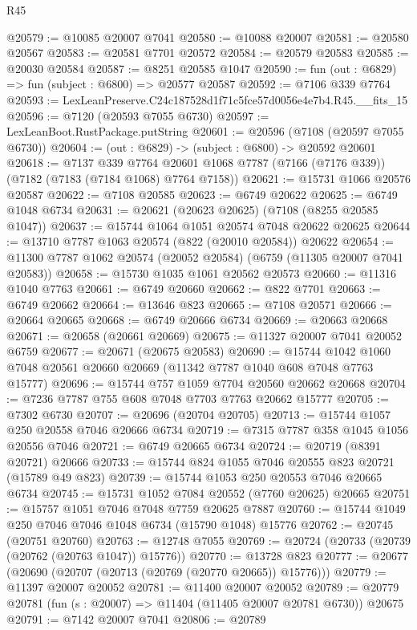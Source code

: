 \begin{lexlean}{R45}
\begin{coremodule}
{@20579 := @10085 @20007 @7041
@20580 := @10088 @20007
@20581 := @20580 @20567
@20583 := @20581 @7701 @20572
@20584 := @20579 @20583
@20585 := @20030 @20584
@20587 := @8251 @20585 @1047
@20590 := fun (out : @6829) => fun (subject : @6800) => @20577 @20587
@20592 := @7106 @339 @7764
@20593 := LexLeanPreserve.C24c187528d1f71c5fce57d0056e4e7b4.R45.__fits_15
@20596 := @7120 (@20593 @7055 @6730)
@20597 := LexLeanBoot.RustPackage.putString
@20601 := @20596 (@7108 (@20597 @7055 @6730))
@20604 := (out : @6829) -> (subject : @6800) -> @20592 @20601
@20618 := @7137
    @339
    @7764
    @20601
    @1068
    @7787
    (@7166 (@7176 @339))
    (@7182 (@7183 (@7184 @1068) @7764 @7158))
@20621 := @15731 @1066 @20576 @20587
@20622 := @7108 @20585
@20623 := @6749 @20622
@20625 := @6749 @1048 @6734
@20631 := @20621 (@20623 @20625) (@7108 (@8255 @20585 @1047))
@20637 := @15744 @1064 @1051 @20574 @7048 @20622 @20625
@20644 := @13710 @7787 @1063 @20574 (@822 (@20010 @20584)) @20622
@20654 := @11300 @7787 @1062 @20574 (@20052 @20584) (@6759 (@11305 @20007 @7041 @20583))
@20658 := @15730 @1035 @1061 @20562 @20573
@20660 := @11316 @1040 @7763
@20661 := @6749 @20660
@20662 := @822 @7701
@20663 := @6749 @20662
@20664 := @13646 @823
@20665 := @7108 @20571
@20666 := @20664 @20665
@20668 := @6749 @20666 @6734
@20669 := @20663 @20668
@20671 := @20658 (@20661 @20669)
@20675 := @11327 @20007 @7041 @20052 @6759
@20677 := @20671 (@20675 @20583)
@20690 := @15744 @1042 @1060 @7048 @20561 @20660 @20669 (@11342 @7787 @1040 @608 @7048 @7763 @15777)
@20696 := @15744 @757 @1059 @7704 @20560 @20662 @20668
@20704 := @7236 @7787 @755 @608 @7048 @7703 @7763 @20662 @15777
@20705 := @7302 @6730
@20707 := @20696 (@20704 @20705)
@20713 := @15744 @1057 @250 @20558 @7046 @20666 @6734
@20719 := @7315 @7787 @358 @1045 @1056 @20556 @7046
@20721 := @6749 @20665 @6734
@20724 := @20719 (@8391 @20721) @20666
@20733 := @15744 @824 @1055 @7046 @20555 @823 @20721 (@15789 @49 @823)
@20739 := @15744 @1053 @250 @20553 @7046 @20665 @6734
@20745 := @15731 @1052 @7084 @20552 (@7760 @20625) @20665
@20751 := @15757 @1051 @7046 @7048 @7759 @20625 @7887
@20760 := @15744 @1049 @250 @7046 @7046 @1048 @6734 (@15790 @1048) @15776
@20762 := @20745 (@20751 @20760)
@20763 := @12748 @7055
@20769 := @20724 (@20733 (@20739 (@20762 (@20763 @1047)) @15776))
@20770 := @13728 @823
@20777 := @20677 (@20690 (@20707 (@20713 (@20769 (@20770 @20665)) @15776)))
@20779 := @11397 @20007 @20052
@20781 := @11400 @20007 @20052
@20789 := @20779 @20781 (fun (s : @20007) => @11404 (@11405 @20007 @20781 @6730)) @20675
@20791 := @7142 @20007 @7041
@20806 := @20789
}
\end{coremodule}
\end{lexlean}
